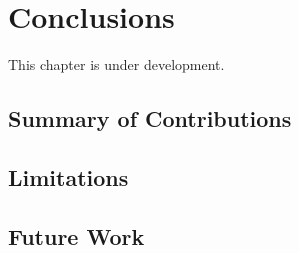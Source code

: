 \chapter{Conclusions}
\label{conclusions}

This chapter is under development.

\section{Summary of Contributions}
\section{Limitations}
\section{Future Work}
